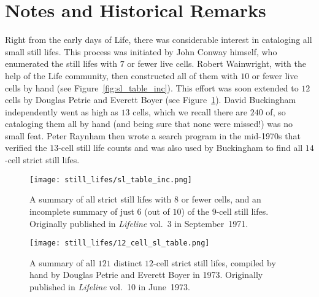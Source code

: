 \section{Notes and Historical Remarks}\label{sec:still_lifes_notes}

Right from the early days of Life, there was considerable interest in cataloging all small still lifes. This process was initiated by John Conway himself, who enumerated the still lifes with $7$ or fewer live cells. Robert Wainwright, with the help of the Life community, then constructed all of them with $10$ or fewer live cells by hand (see Figure~\ref{fig:sl_table_inc}). This effort was soon extended to $12$ cells by Douglas Petrie and Everett Boyer (see Figure~\ref{fig:12_cell_sl_table}). David Buckingham independently went as high as $13$ cells, which we recall there are $240$ of, so cataloging them all by hand (and being sure that none were missed!) was no small feat. Peter Raynham then wrote a search program in the mid-1970s that verified the $13$-cell still life counts and was also used by Buckingham to find all $14$-cell strict still lifes.

\begin{figure}[!htb]
	\centering
	\begin{minipage}[b]{0.48\textwidth}
		\centering\texttt{[image: still\_lifes/sl\_table\_inc.png]}
		\caption{A summary of all strict still lifes with $8$ or fewer cells, and an incomplete summary of just $6$ (out of $10$) of the $9$-cell still lifes. Originally published in \emph{Lifeline} vol.~3 in September~1971.}\label{fig:sl_table_inc}
	\end{minipage}\hfill
	\begin{minipage}[b]{0.48\textwidth}
		\centering\texttt{[image: still\_lifes/12\_cell\_sl\_table.png]}
		\caption{A summary of all $121$ distinct $12$-cell strict still lifes, compiled by hand by Douglas Petrie and Everett Boyer in 1973. Originally published in \emph{Lifeline} vol.~10 in June~1973.}\label{fig:12_cell_sl_table}
	\end{minipage}
\end{figure}

